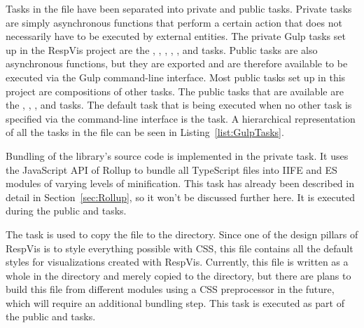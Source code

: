 Tasks in the  file have been separated into private and public tasks.
Private tasks are simply asynchronous functions that perform a certain action that does not necessarily have to be executed by external entities.
The private Gulp tasks set up in the RespVis project are the , , , , , and  tasks.  
Public tasks are also asynchronous functions, but they are exported and are therefore available to be executed via the Gulp command-line interface.
Most public tasks set up in this project are compositions of other tasks.
The public tasks that are available are the , , , and  tasks.
The default task that is being executed when no other task is specified via the command-line interface is the  task.
A hierarchical representation of all the tasks in the  file can be seen in Listing~\ref{list:GulpTasks}.

\begin{samepage}
%
    A hierarichal representation of the tasks defined in the  file.
    This presentation has been created with the  command.
  },
]{listings/gulp-tasks.txt}
\end{samepage}
  


Bundling of the library's source code is implemented in the private  task. 
It uses the JavaScript API of Rollup to bundle all TypeScript files into IIFE and ES modules of varying levels of minification. 
This task has already been described in detail in Section~\ref{sec:Rollup}, so it won't be discussed further here.
It is executed during the public  and  tasks.

The  task is used to copy the  file to the  directory.
Since one of the design pillars of RespVis is to style everything possible with CSS, this file contains all the default styles for visualizations created with RespVis.
Currently, this file is written as a whole in the  directory and merely copied to the  directory, but there are plans to build this file from different modules using a CSS preprocessor in the future, which will require an additional bundling step.
This task is executed as part of the public  and  tasks.

